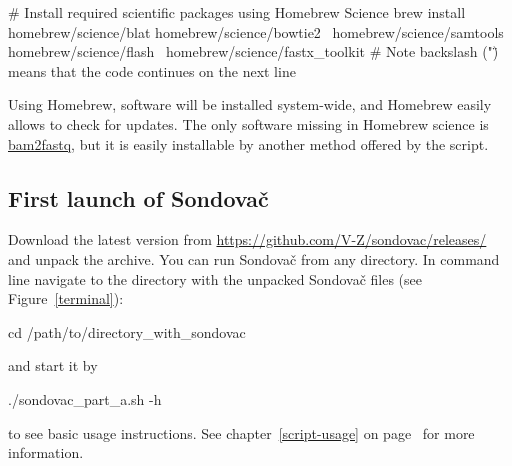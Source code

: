 \documentclass[a4paper, 11pt, twoside]{article}
\begin{document}
\begin{bashcode}
  # Install required scientific packages using Homebrew Science
  brew install homebrew/science/blat homebrew/science/bowtie2 \
    homebrew/science/samtools homebrew/science/flash \
    homebrew/science/fastx_toolkit
  # Note backslash ("\") means that the code continues on the next line
\end{bashcode}

Using Homebrew, software will be installed system-wide, and Homebrew easily allows to check for updates. The only software missing in Homebrew science is \href{http://gsl.hudsonalpha.org/information/software/bam2fastq}{bam2fastq}, but it is easily installable by another method offered by the script.

\subsection{First launch of Sondovač}
\label{script-start}

Download the latest version from \url{https://github.com/V-Z/sondovac/releases/} and unpack the archive. You can run Sondovač from any directory. In command line navigate to the directory with the unpacked Sondovač files (see Figure~\ref{terminal}):

\begin{bashcode}
  cd /path/to/directory_with_sondovac
\end{bashcode}

and start it by

\begin{bashcode}
  ./sondovac_part_a.sh -h
\end{bashcode}

to see basic usage instructions. See chapter~\ref{script-usage} on page~\pageref{script-usage} for more information.
\end{document}

